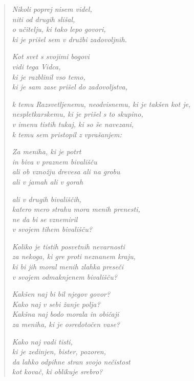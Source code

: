 \begin{verse}


\emph{Nikoli poprej nisem videl,}\\
\emph{niti od drugih slišal,}\\
\emph{o učitelju, ki tako lepo govori,}\\
\emph{ki je prišel sem v družbi zadovoljnih.}

\emph{Kot svet s svojimi bogovi}\\
\emph{vidi tega Vidca,}\\
\emph{ki je razblinil vso temo,}\\
\emph{ki je sam zase prišel do zadovoljstva,}

\emph{k temu Razsvetljenemu, neodvisnemu, ki je takšen kot je,}\\
\emph{nespletkarskemu, ki je prišel s to skupino,}\\
\emph{v imenu tistih tukaj, ki so še navezani,}\\
\emph{k temu sem pristopil z vprašanjem:}

\emph{Za meniha, ki je potrt}\\
\emph{in biva v praznem bivališču}\\
\emph{ali ob vznožju drevesa ali na grobu}\\
\emph{ali v jamah ali v gorah}

\emph{ali v drugih bivališčih,}\\
\emph{katero mero strahu mora menih prenesti,}\\
\emph{ne da bi se vznemiril}\\
\emph{v svojem tihem bivališču?}

\emph{Koliko je tistih posvetnih nevarnosti}\\
\emph{za nekoga, ki gre proti neznanem kraju,}\\
\emph{ki bi jih moral menih zlahka preseči}\\
\emph{v svojem odmaknjenem bivališču?}

\emph{Kakšen naj bi bil njegov govor?}\\
\emph{Kako naj v sebi žanje polja?}\\
\emph{Kakšna naj bodo morala in običaji}\\
\emph{za meniha, ki je osredotočen vase?}

\emph{Kako naj vadi tisti,}\\
\emph{ki je zedinjen, bister, pozoren,}\\
\emph{da lahko odpihne stran svojo nečistost}\\
\emph{kot kovač, ki oblikuje srebro?}


\end{verse}
